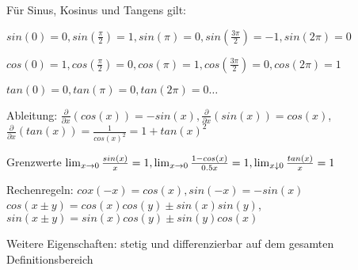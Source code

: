 \begin{definition}[Eigenschaften]
	Für Sinus, Kosinus und Tangens gilt:
	\begin{description}[noitemsep]
		\item $sin(0) = 0, sin( \frac{\pi}{2})=1, sin(\pi) = 0, sin(\frac{3 \pi}{2}) = -1, sin(2 \pi) = 0$
		\item $cos(0) = 1, cos (\frac{\pi}{2}) = 0, cos (\pi) = 1, cos(\frac{3 \pi}{2}) = 0, cos (2 \pi) = 1$
		\item $tan(0) = 0, tan(\pi) = 0, tan(2 \pi) = 0 \dots$
		\item Ableitung: $\frac{\partial}{\partial x}(cos(x)) = -sin(x), \frac{\partial}{\partial x}(sin(x)) = cos(x)$, \\ $\frac{\partial}{\partial x}(tan(x)) = \frac{1}{cos(x)^2} = 1 + tan(x)^2$
		\item Grenzwerte $\lim_{x \rightarrow 0} \frac{sin(x)}{x} = 1, \lim_{x \rightarrow 0} \frac{1 - cos(x)}{0.5x} = 1, \lim_{x \downarrow 0} \frac{tan (x)}{x} = 1$
		\item Rechenregeln: $cox(-x) = cos(x), sin(-x) = -sin(x)$ \\ $cos(x \pm y) = cos(x)cos(y) \pm sin(x)sin(y)$, \\ $sin(x \pm y) = sin(x)cos(y) \pm sin(y)cos(x)$
		\item Weitere Eigenschaften: stetig und differenzierbar auf dem gesamten Definitionsbereich
	\end{description}
\end{definition}

\pagebreak

